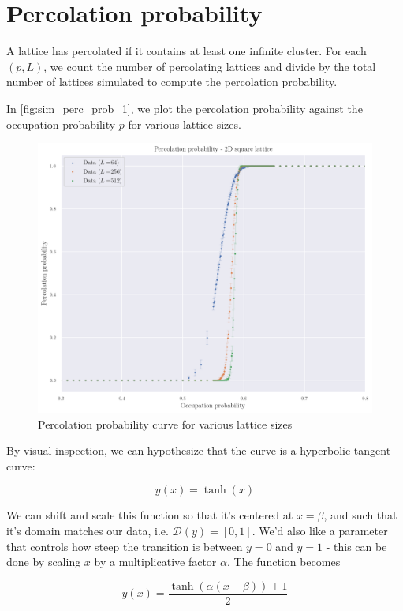 \section{Percolation probability}

A lattice has percolated if it contains at least one infinite cluster. For each $(p, L)$, we count the number of percolating lattices and divide by the total number of lattices simulated to compute the percolation probability.

In \autoref{fig:sim_perc_prob_1}, we plot the percolation probability against the occupation probability $p$ for various lattice sizes.


\begin{figure}[H]
  \includegraphics[width=\linewidth]{Images/sim_perc_prob_1.png}
  \caption{Percolation probability curve for various lattice sizes}
  \label{fig:sim_perc_prob_1}
\end{figure}

By visual inspection, we can hypothesize that the curve is a hyperbolic tangent curve: 

$$ 
y(x) = \tanh(x)
$$

We can shift and scale this function so that it's centered at $x=\beta$, and such that it's domain matches our data, i.e. $\mathcal{D}(y) = \left[ 0, 1 \right]$. We'd also like a parameter that controls how steep the transition is between $y=0$ and $y=1$ - this can be done by scaling $x$ by a multiplicative factor $\alpha$. The function becomes

$$ 
y(x) = \frac{\tanh(\alpha(x - \beta)) + 1}{2}
$$ 

